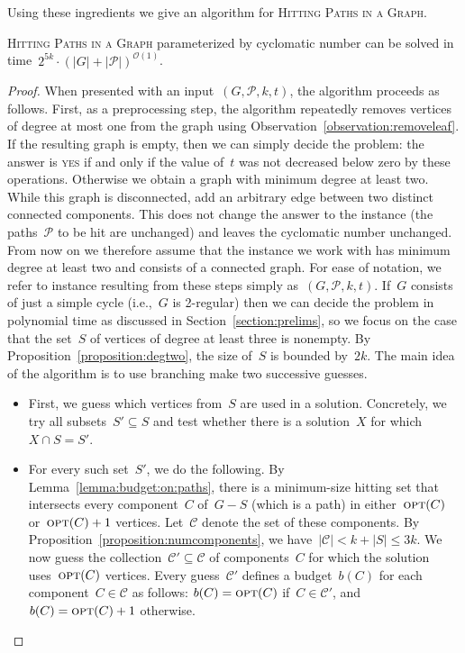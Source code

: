 \let\accentvec\vec  \documentclass{llncs}
\newcommand{\yes}{\textsc{yes}\xspace}
\newcommand{\Oh}{{\mathcal{O}}}
\newcommand{\C}{{\mathcal{C}}}
\renewcommand{\P}{\ensuremath{\mathcal{P}}\xspace}
\newcommand{\opt}{\ensuremath{\mathrm{\textsc{opt}}}\xspace}
\renewcommand{\C}{\ensuremath{\mathcal{C}}\xspace}
\newcommand{\HitPathsInGraph}{\textsc{Hitting Paths in a Graph}\xspace}
\begin{document}
Using these ingredients we give an algorithm for \HitPathsInGraph.

\begin{theorem} \label{theorem:pathsingraph:fpt}
\HitPathsInGraph parameterized by cyclomatic number can be solved in time~$2^{5k} \cdot (|G| + |\P|)^{\Oh(1)}$.
\end{theorem}
\begin{proof}
When presented with an input~$(G,\P,k,t)$, the algorithm proceeds as follows. First, as a preprocessing step, the algorithm repeatedly removes vertices of degree at most one from the graph using Observation~\ref{observation:removeleaf}. If the resulting graph is empty, then we can simply decide the problem: the answer is \yes if and only if the value of~$t$ was not decreased below zero by these operations. Otherwise we obtain a graph with minimum degree at least two. While this graph is disconnected, add an arbitrary edge between two distinct connected components. This does not change the answer to the instance (the paths~$\P$ to be hit are unchanged) and leaves the cyclomatic number unchanged. From now on we therefore assume that the instance we work with has minimum degree at least two and consists of a connected graph. For ease of notation, we refer to instance resulting from these steps simply as~$(G,\P,k,t)$. If~$G$ consists of just a simple cycle (i.e.,~$G$ is 2-regular) then we can decide the problem in polynomial time as discussed in Section~\ref{section:prelims}, so we focus on the case that the set~$S$ of vertices of degree at least three is nonempty. By Proposition~\ref{proposition:degtwo}, the size of~$S$ is bounded by~$2k$. The main idea of the algorithm is to use branching make two successive guesses. 
\begin{itemize}
	\item First, we guess which vertices from~$S$ are used in a solution. Concretely, we try all subsets~$S' \subseteq S$ and test whether there is a solution~$X$ for which~$X \cap S = S'$. 
	\item For every such set~$S'$, we do the following. By Lemma~\ref{lemma:budget:on:paths}, there is a minimum-size hitting set that intersects every component~$C$ of~$G - S$ (which is a path) in either~$\opt(C)$ or~$\opt(C) + 1$ vertices. Let~$\C$ denote the set of these components. By Proposition~\ref{proposition:numcomponents}, we have~$|\C| < k + |S| \leq 3k$. We now guess the collection~$\C' \subseteq \C$ of components~$C$ for which the solution uses~$\opt(C)$ vertices. Every guess~$\C'$ defines a budget~$b(C)$ for each component~$C \in \C$ as follows: $b(C) = \opt(C)$ if~$C \in \C'$, and~$b(C) = \opt(C) + 1$ otherwise.
\end{itemize}


\end{proof}
\end{document}
